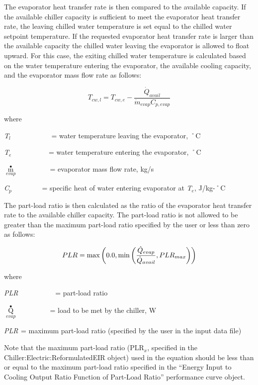 The evaporator heat transfer rate is then compared to the available capacity. If the available chiller capacity is sufficient to meet the evaporator heat transfer rate, the leaving chilled water temperature is set equal to the chilled water setpoint temperature. If the requested evaporator heat transfer rate is larger than the available capacity the chilled water leaving the evaporator is allowed to float upward. For this case, the exiting chilled water temperature is calculated based on the water temperature entering the evaporator, the available cooling capacity, and the evaporator mass flow rate as follows:

\begin{equation}
  T_{cw,l}  =  T_{cw,e} - \frac{\dot{Q}_{avail}}{\dot{m}_{evap}C_{p,evap}}
\end{equation}

where

\emph{T\(_{l}\)}~~~~~~~~~~~ = water temperature leaving the evaporator, ˚C

\emph{T\(_{e}\)}~~~~~~~~~~ = water temperature entering the evaporator, ˚C

\({\mathop m\limits^ \bullet_{evap}}\) ~~~~~~~~ = evaporator mass flow rate, kg/s

\emph{C\(_{p}\)}~~~~~~~~ = specific heat of water entering evaporator at \emph{T\(_{e}\)}, J/kg-˚C

The part-load ratio is then calculated as the ratio of the evaporator heat transfer rate to the available chiller capacity. The part-load ratio is not allowed to be greater than the maximum part-load ratio specified by the user or less than zero as follows:

\begin{equation}
  PLR = \max\PB{0.0,\min\PB{\frac{\dot{Q}_{evap}}{\dot{Q}_{avail}},PLR_{max}}}
\end{equation}

where

\emph{PLR}~~~~~~~~~~ = part-load ratio

\({\mathop Q\limits^ \bullet_{evap}}\) ~~~~~~~~ = load to be met by the chiller, W

\emph{PLR\(_{ }\)} = maximum part-load ratio (specified by the user in the input data file)

Note that the maximum part-load ratio (PLR\(_{x}\), specified in the Chiller:Electric:ReformulatedEIR object) used in the equation should be less than or equal to the maximum part-load ratio specified in the ``Energy Input to Cooling Output Ratio Function of Part-Load Ratio'' performance curve object.

